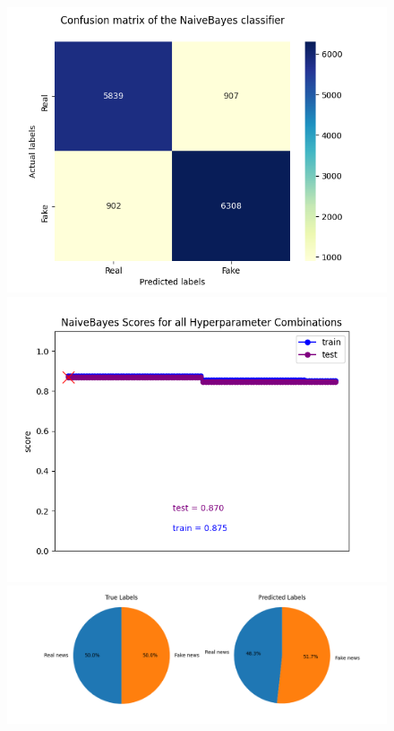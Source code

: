 \documentclass[10pt,twocolumn,letterpaper]{article}
\begin{document}
\begin{figure}[h]
   \begin{center}
        \includegraphics[scale=0.6]{graphs/NB/confusion_matrix.png}
        \includegraphics[scale=0.6]{graphs/NB/scores_plot.png}
        \includegraphics[scale=0.6]{graphs/NB/piechart.png}
   \end{center}
        \vspace*{-5mm}
        \caption{\label{fifth_figure}}
\end{figure}
\end{document}
